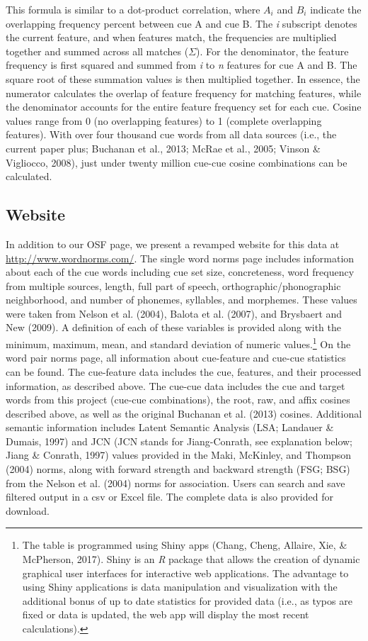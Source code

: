 \documentclass[english,,man]{apa6}
\let\rmarkdownfootnote\footnote%
\def\footnote{\protect\rmarkdownfootnote}
\begin{document}
This formula is similar to a dot-product correlation, where \(A_i\) and \(B_i\) indicate the overlapping frequency percent between cue A and cue B. The \emph{i} subscript denotes the current feature, and when features match, the frequencies are multiplied together and summed across all matches (\(\Sigma\)). For the denominator, the feature frequency is first squared and summed from \emph{i} to \emph{n} features for cue A and B. The square root of these summation values is then multiplied together. In essence, the numerator calculates the overlap of feature frequency for matching features, while the denominator accounts for the entire feature frequency set for each cue. Cosine values range from 0 (no overlapping features) to 1 (complete overlapping features). With over four thousand cue words from all data sources (i.e., the current paper plus; Buchanan et al., 2013; McRae et al., 2005; Vinson \& Vigliocco, 2008), just under twenty million cue-cue cosine combinations can be calculated.

\hypertarget{website}{%
\subsection{Website}\label{website}}

In addition to our OSF page, we present a revamped website for this data at \url{http://www.wordnorms.com/}. The single word norms page includes information about each of the cue words including cue set size, concreteness, word frequency from multiple sources, length, full part of speech, orthographic/phonographic neighborhood, and number of phonemes, syllables, and morphemes. These values were taken from Nelson et al. (2004), Balota et al. (2007), and Brysbaert and New (2009). A definition of each of these variables is provided along with the minimum, maximum, mean, and standard deviation of numeric values.\footnote{The table is programmed using Shiny apps (Chang, Cheng, Allaire, Xie, \& McPherson, 2017). Shiny is an \emph{R} package that allows the creation of dynamic graphical user interfaces for interactive web applications. The advantage to using Shiny applications is data manipulation and visualization with the additional bonus of up to date statistics for provided data (i.e., as typos are fixed or data is updated, the web app will display the most recent calculations).} On the word pair norms page, all information about cue-feature and cue-cue statistics can be found. The cue-feature data includes the cue, features, and their processed information, as described above. The cue-cue data includes the cue and target words from this project (cue-cue combinations), the root, raw, and affix cosines described above, as well as the original Buchanan et al. (2013) cosines. Additional semantic information includes Latent Semantic Analysis (LSA; Landauer \& Dumais, 1997) and JCN (JCN stands for Jiang-Conrath, see explanation below; Jiang \& Conrath, 1997) values provided in the Maki, McKinley, and Thompson (2004) norms, along with forward strength and backward strength (FSG; BSG) from the Nelson et al. (2004) norms for association. Users can search and save filtered output in a csv or Excel file. The complete data is also provided for download.
\end{document}
